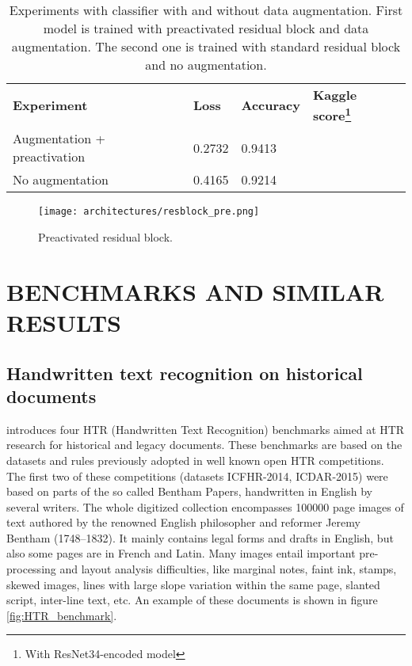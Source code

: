 \begin{table*}[h]
	\begin{minipage}{.7\textwidth}
	\begin{tabular}{llll}
		\rowcolor[HTML]{EFEFEF} 
		\textbf{Experiment} & \textbf{Loss} & \textbf{Accuracy} & \textbf{Kaggle score\footnote{With ResNet34-encoded model}} \\
		Augmentation + preactivation & 0.2732 & 0.9413 &  \\
		No augmentation& 0.4165 & 0.9214 &
	\end{tabular}
	\end{minipage}
	\caption{Experiments with classifier with and without data augmentation. First model is trained with preactivated residual block and data augmentation. The second one is trained with standard residual block and no augmentation.}
	\label{tab:classres}
\end{table*}

\begin{figure}[h]
	\caption{Preactivated residual block.}
	\centering
	\texttt{[image: architectures/resblock\_pre.png]}
	\label{fig:preactresblock}
\end{figure}

\section{\uppercase{Benchmarks and similar results}}
\label{sec:stateofart}

\subsection{Handwritten text recognition on historical documents}
\label{ssec:historicaldocuments}

\cite{Sanchez2019-pi} introduces four HTR (Handwritten Text Recognition) benchmarks aimed at HTR research for historical and legacy documents. These benchmarks are based on the datasets and rules previously adopted in well known open HTR competitions. The first two of these competitions (datasets ICFHR-2014, ICDAR-2015) were based on parts of the so called Bentham Papers, handwritten in English by several writers. The whole digitized collection encompasses 100000 page images of text authored by the renowned English philosopher and reformer Jeremy Bentham (1748–1832). It mainly contains legal forms and drafts in English, but also some pages are in French and Latin. Many images entail important pre-processing and layout analysis difficulties, like marginal notes, faint ink, stamps, skewed images, lines with large slope variation within the same page, slanted script, inter-line text, etc. An example of these documents is shown in figure \ref{fig:HTR_benchmark}.

